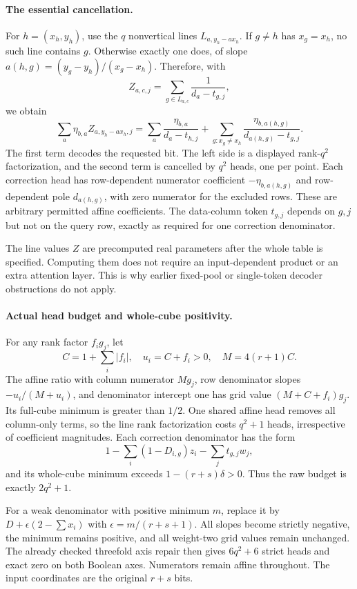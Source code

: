 \documentclass[11pt]{article}
\begin{document}
\paragraph{The essential cancellation.}
For $h=(x_h,y_h)$, use the $q$ nonvertical lines
$L_{a,y_h-ax_h}$. If $g\ne h$ has $x_g=x_h$, no such line contains $g$.
Otherwise exactly one does, of slope
$a(h,g)=(y_g-y_h)/(x_g-x_h)$. Therefore, with
\[
 Z_{a,c,j}=\sum_{g\in L_{a,c}}\frac1{d_a-t_{g,j}},
\]
we obtain
\[
 \sum_a\eta_{b,a}Z_{a,y_h-ax_h,j}
 =\sum_a\frac{\eta_{b,a}}{d_a-t_{h,j}}
  +\sum_{g:x_g\ne x_h}
       \frac{\eta_{b,a(h,g)}}{d_{a(h,g)}-t_{g,j}}.
\]
The first term decodes the requested bit. The left side is a displayed
rank-$q^2$ factorization, and the second term is cancelled by $q^2$
heads, one per point. Each correction head has row-dependent numerator
coefficient $-\eta_{b,a(h,g)}$ and row-dependent pole
$d_{a(h,g)}$, with zero numerator for the excluded rows. These are
arbitrary permitted affine coefficients. The data-column token
$t_{g,j}$ depends on $g,j$ but not on the query row, exactly as required
for one correction denominator.

The line values $Z$ are precomputed real parameters after the whole table
is specified. Computing them does not require an input-dependent product
or an extra attention layer. This is why earlier fixed-pool or
single-token decoder obstructions do not apply.

\paragraph{Actual head budget and whole-cube positivity.}
For any rank factor $f_i g_j$, let
\[
 C=1+\sum_i|f_i|,\quad u_i=C+f_i>0,\quad M=4(r+1)C.
\]
The affine ratio with column numerator $M g_j$, row denominator slopes
$-u_i/(M+u_i)$, and denominator intercept one has grid value
$(M+C+f_i)g_j$. Its full-cube minimum is greater than $1/2$.
One shared affine head removes all column-only terms, so the line rank
factorization costs $q^2+1$ heads, irrespective of coefficient magnitudes.
Each correction denominator has the form
\[
 1-\sum_i(1-D_{i,g})z_i-\sum_jt_{g,j}w_j,
\]
and its whole-cube minimum exceeds $1-(r+s)\delta>0$.
Thus the raw budget is exactly $2q^2+1$.

For a weak denominator with positive minimum $m$, replace it by
$D+\epsilon(2-\sum x_i)$ with $\epsilon=m/(r+s+1)$.
All slopes become strictly negative, the minimum remains positive, and
all weight-two grid values remain unchanged. The already checked
threefold axis repair then gives $6q^2+6$ strict heads and exact zero on
both Boolean axes. Numerators remain affine throughout. The input
coordinates are the original $r+s$ bits.
\end{document}
